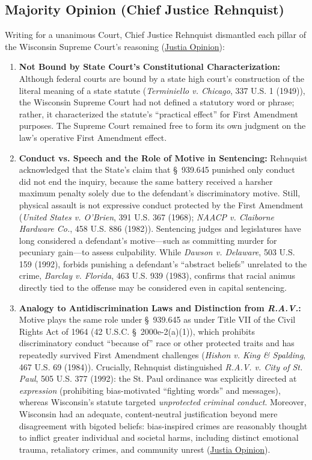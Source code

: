 \documentclass[12pt]{article}
\begin{document}
\subsection{Majority Opinion (Chief Justice Rehnquist)}
Writing for a unanimous Court, Chief Justice Rehnquist dismantled each pillar of the Wisconsin Supreme Court's reasoning (\href{https://supreme.justia.com/cases/federal/us/508/476/}{Justia Opinion}):
\begin{enumerate}
    \item \textbf{Not Bound by State Court's Constitutional Characterization:} Although federal courts are bound by a state high court's construction of the literal meaning of a state statute (\textit{Terminiello v. Chicago}, 337 U.S. 1 (1949)), the Wisconsin Supreme Court had not defined a statutory word or phrase; rather, it characterized the statute's ``practical effect'' for First Amendment purposes. The Supreme Court remained free to form its own judgment on the law's operative First Amendment effect.
    \item \textbf{Conduct vs. Speech and the Role of Motive in Sentencing:} Rehnquist acknowledged that the State's claim that \S~939.645 punished only conduct did not end the inquiry, because the same battery received a harsher maximum penalty solely due to the defendant's discriminatory motive. Still, physical assault is not expressive conduct protected by the First Amendment (\textit{United States v. O'Brien}, 391 U.S. 367 (1968); \textit{NAACP v. Claiborne Hardware Co.}, 458 U.S. 886 (1982)). Sentencing judges and legislatures have long considered a defendant's motive---such as committing murder for pecuniary gain---to assess culpability. While \textit{Dawson v. Delaware}, 503 U.S. 159 (1992), forbids punishing a defendant's ``abstract beliefs'' unrelated to the crime, \textit{Barclay v. Florida}, 463 U.S. 939 (1983), confirms that racial animus directly tied to the offense may be considered even in capital sentencing.
    \item \textbf{Analogy to Antidiscrimination Laws and Distinction from \textit{R.A.V.}:} Motive plays the same role under \S~939.645 as under Title VII of the Civil Rights Act of 1964 (42 U.S.C. \S~2000e-2(a)(1)), which prohibits discriminatory conduct ``because of'' race or other protected traits and has repeatedly survived First Amendment challenges (\textit{Hishon v. King \& Spalding}, 467 U.S. 69 (1984)). Crucially, Rehnquist distinguished \textit{R.A.V. v. City of St. Paul}, 505 U.S. 377 (1992): the St. Paul ordinance was explicitly directed at \textit{expression} (prohibiting bias-motivated ``fighting words'' and messages), whereas Wisconsin's statute targeted \textit{unprotected criminal conduct}. Moreover, Wisconsin had an adequate, content-neutral justification beyond mere disagreement with bigoted beliefs: bias-inspired crimes are reasonably thought to inflict greater individual and societal harms, including distinct emotional trauma, retaliatory crimes, and community unrest (\href{https://supreme.justia.com/cases/federal/us/508/476/}{Justia Opinion}).

\end{enumerate}
\end{document}
